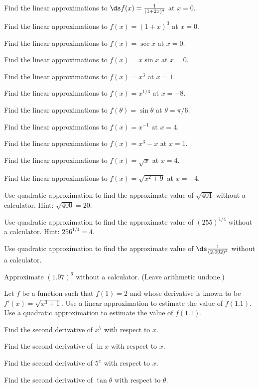 \begin{multicols}{2}
  \problem Find the linear approximations to $\ds f(x)=\frac{1}{ (1+2x)^4}$
  at $x=0$.


  \problem Find the linear approximations to $f(x)=(1+x)^3$ at $x=0$.


  \problem Find the linear approximations to $f(x)=\sec x$ at $x=0$.


  \problem Find the linear approximations to $f(x)=x\sin x$ at $x=0$.


  \problem Find the linear approximations to $f(x)=x^3$ at $x=1$.


  \problem Find the linear approximations to $f(x)=x^{1/3}$ at $x=-8$.


  \problem Find the linear approximations to $f(\theta)=\sin \theta$ at
  $\theta={\pi/6}$.


  \problem Find the linear approximations to $f(x)=x^{-1}$ at $x=4$.


  \problem Find the linear approximations to $f(x)=x^3-x$ at $x=1$.


  \problem Find the linear approximations to $f(x)=\sqrt{x}$ at $x=4$.


  \problem Find the linear approximations to $f(x)=\sqrt{x^2+9}$ at $x=-4$.


  \problem Use quadratic approximation to find the approximate value of
  $\sqrt{401}$ without a calculator.  Hint: $\sqrt{400}=20$.


  \problem Use quadratic approximation to find the approximate value of
  $(255)^{1/4}$ without a calculator. Hint: $256^{1/4}=4$.


  \problem Use quadratic approximation to find the approximate value of
  $\ds\frac{1}{ (2.002)^2} $ without a calculator.


  \problem Approximate $(1.97)^6$ without a calculator. (Leave arithmetic
  undone.)


  \problem Let $f$ be a function such that $f(1)=2$ and whose derivative is
  known to be $f'(x)=\sqrt{x^3+1}$.  Use a linear approximation to estimate
  the value of $f(1.1)$.  Use a quadratic approximation to estimate the value
  of $f(1.1)$.


  \problem Find the second derivative of $x^7$ with respect to $x$.


  \problem Find the second derivative of $\ln x$ with respect to $x$.


  \problem Find the second derivative of $5^x$ with respect to $x$.


  \problem Find the second derivative of $\tan \theta$ with respect to
  $\theta$.



\end{multicols}
